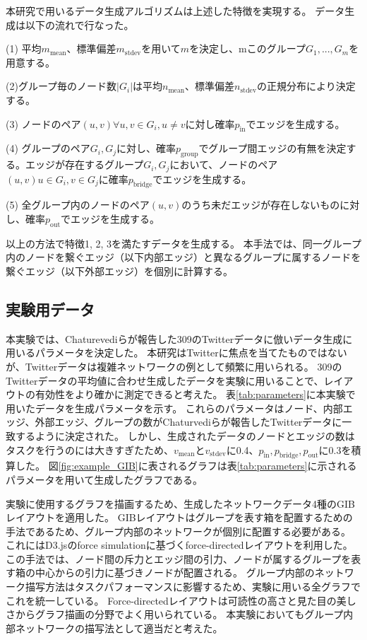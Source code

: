 \documentclass{kuee}
\begin{document}
本研究で用いるデータ生成アルゴリズムは上述した特徴を実現する。
データ生成は以下の流れで行なった。
\begin{description}
  \item{(1)} 平均$m_{\text{mean}}$、標準偏差$m_{\text{stdev}}$を用いて$m$を決定し、mこのグループ${G_1, ..., G_m}$を用意する。
  \item{(2)}グループ毎のノード数$|G_i|$は平均$n_{\text{mean}}$、標準偏差$n_{\text{stdev}}$の正規分布により決定する。
  \item{(3)} ノードのペア$(u, v) \forall u,v \in G_i, u \neq v$に対し確率$p_{\text{in}}$でエッジを生成する。
  \item{(4)} グループのペア$G_i, G_j$に対し、確率$p_{\text{group}}$でグループ間エッジの有無を決定する。エッジが存在するグループ$G_i, G_j$において、ノードのペア$(u, v) u \in G_i, v \in G_j$に確率$p_{\text{bridge}}$でエッジを生成する。
  \item{(5)} 全グループ内のノードのペア$(u, v)$のうち未だエッジが存在しないものに対し、確率$p_{\text{out}}$でエッジを生成する。
\end{description}
以上の方法で特徴1, 2, 3を満たすデータを生成する。
本手法では、同一グループ内のノードを繋ぐエッジ（以下内部エッジ）と異なるグループに属するノードを繋ぐエッジ（以下外部エッジ）を個別に計算する。

\subsection{実験用データ}
\label{subsec:data_for_ex1}

本実験では、Chaturevediらが報告した309のTwitterデータ\cite{chaturvedi2014group}に倣いデータ生成に用いるパラメータを決定した。
本研究はTwitterに焦点を当てたものではないが、Twitterデータは複雑ネットワークの例として頻繁に用いられる。
309のTwitterデータの平均値に合わせ生成したデータを実験に用いることで、レイアウトの有効性をより確かに測定できると考えた。
表\ref{tab:parameters}に本実験で用いたデータを生成パラメータを示す。
これらのパラメータはノード、内部エッジ、外部エッジ、グループの数がChaturvediらが報告したTwitterデータに一致するように決定された。
しかし、生成されたデータのノードとエッジの数はタスクを行うのには大きすぎたため、$v_{\text{mean}}$と$v_{\text{stdev}}$に0.4、$p_{\text{in}}, p_{\text{bridge}}, p_{\text{out}}$に0.3を積算した。
図\ref{fig:example_GIB}に表されるグラフは表\ref{tab:parameters}に示されるパラメータを用いて生成したグラフである。

実験に使用するグラフを描画するため、生成したネットワークデータ4種のGIBレイアウトを適用した。
GIBレイアウトはグループを表す箱を配置するための手法であるため、グループ内部のネットワークが個別に配置する必要がある。
これにはD3.jsのforce simulation\cite{Bostock:2011:DDD:2068462.2068631}に基づくforce-directedレイアウトを利用した。
この手法では、ノード間の斥力とエッジ間の引力、ノードが属するグループを表す箱の中心からの引力に基づきノードが配置される。
グループ内部のネットワーク描写方法はタスクパフォーマンスに影響するため、実験に用いる全グラフでこれを統一している。
Force-directedレイアウトは可読性の高さと見た目の美しさからグラフ描画の分野でよく用いられている\cite{Kobourov2013ForceDirectedDA}。
本実験においてもグループ内部ネットワークの描写法として適当だと考えた。
\end{document}
